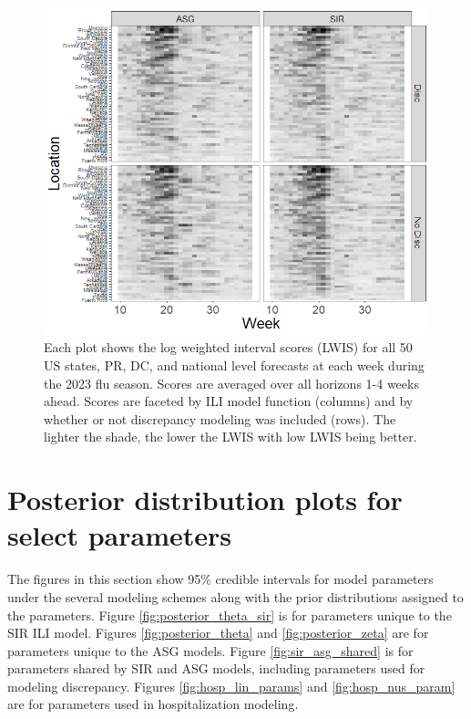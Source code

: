\documentclass[ba]{imsart}
\theoremstyle{plain}
\theoremstyle{definition}
\theoremstyle{remark}
\begin{document}
\begin{supplement}
\begin{figure}[hbt!]
    \centering
    \includegraphics[scale = .7]{Images/lwis_by_traj_loc.png}
    \caption{Each plot shows the log weighted interval scores (LWIS) for all 50 US states, PR, DC, and national level forecasts at each week during the 2023 flu season. Scores are averaged over all horizons 1-4 weeks ahead. Scores are faceted by ILI model function (columns) and by whether or not discrepancy modeling was included (rows). The lighter the shade, the lower the LWIS with low LWIS being better.}
    \label{fig:lwis_by_traj_loc}
\end{figure}



\section{Posterior distribution plots for select parameters}
\label{app:B_prior}

The figures in this section show 95\% credible intervals for model parameters under the several modeling schemes along with the prior distributions assigned to the parameters. Figure \ref{fig:posterior_theta_sir} is for parameters unique to the SIR ILI model. Figures \ref{fig:posterior_theta} and \ref{fig:posterior_zeta} are for parameters unique to the ASG models. Figure \ref{fig:sir_asg_shared} is for parameters shared by SIR and ASG models, including parameters used for modeling discrepancy. Figures \ref{fig:hosp_lin_params} and \ref{fig:hosp_nus_param} are for parameters used in hospitalization modeling.



\end{supplement}
\end{document}

